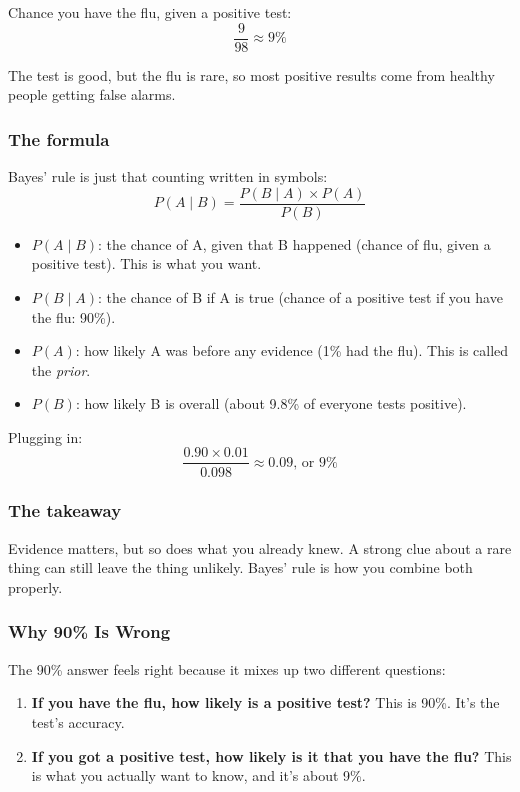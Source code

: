 Chance you have the flu, given a positive test:
\[
\frac{9}{98} \approx 9\%
\]

The test is good, but the flu is rare, so most positive results come from healthy people getting false alarms.

\subsubsection*{The formula}

Bayes' rule is just that counting written in symbols:
\[
P(A \mid B) = \frac{P(B \mid A) \times P(A)}{P(B)}
\]

\begin{itemize}
  \item $P(A \mid B)$: the chance of A, given that B happened (chance of flu, given a positive test). This is what you want.
  \item $P(B \mid A)$: the chance of B if A is true (chance of a positive test if you have the flu: 90\%).
  \item $P(A)$: how likely A was before any evidence (1\% had the flu). This is called the \emph{prior}.
  \item $P(B)$: how likely B is overall (about 9.8\% of everyone tests positive).
\end{itemize}

Plugging in:
\[
\frac{0.90 \times 0.01}{0.098} \approx 0.09 \text{, or } 9\%
\]

\subsubsection*{The takeaway}

Evidence matters, but so does what you already knew. A strong clue about a rare thing can still leave the thing unlikely. Bayes' rule is how you combine both properly.

\subsubsection*{Why 90\% Is Wrong}

The 90\% answer feels right because it mixes up two different questions:

\begin{enumerate}
  \item \textbf{If you have the flu, how likely is a positive test?} This is 90\%. It's the test's accuracy.
  \item \textbf{If you got a positive test, how likely is it that you have the flu?} This is what you actually want to know, and it's about 9\%.
\end{enumerate}

